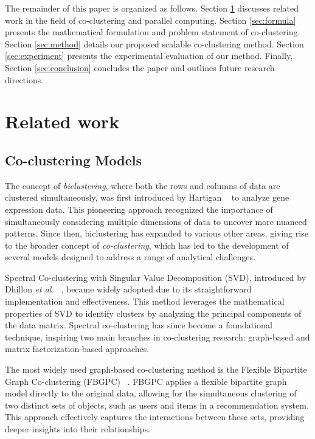 \documentclass[journal]{IEEEtran}
\renewcommand{\cite}[1]{~\autocite{#1}}
\begin{document}
The remainder of this paper is organized as follows. Section \ref{sec:related_work} discusses related work in the field of co-clustering and parallel computing. Section \ref{sec:formula} presents the mathematical formulation and problem statement of co-clustering. Section \ref{sec:method} details our proposed scalable co-clustering method. Section \ref{sec:experiment} presents the experimental evaluation of our method. Finally, Section \ref{sec:conclusion} concludes the paper and outlines future research directions.

\section{Related work}
\label{sec:related_work}

\subsection{Co-clustering Models}

The concept of \emph{biclustering}, where both the rows and columns of data are clustered simultaneously, was first introduced by Hartigan \cite{hartigan1972DirectClusteringData} to analyze gene expression data. This pioneering approach recognized the importance of simultaneously considering multiple dimensions of data to uncover more nuanced patterns. Since then, biclustering has expanded to various other areas, giving rise to the broader concept of \emph{co-clustering}, which has led to the development of several models designed to address a range of analytical challenges.

Spectral Co-clustering with Singular Value Decomposition (SVD), introduced by Dhillon \textit{et al.} \cite{dhillon2001CoclusteringDocumentsWords}, became widely adopted due to its straightforward implementation and effectiveness. This method leverages the mathematical properties of SVD to identify clusters by analyzing the principal components of the data matrix. Spectral co-clustering has since become a foundational technique, inspiring two main branches in co-clustering research: graph-based and matrix factorization-based approaches.

The most widely used graph-based co-clustering method is the Flexible Bipartite Graph Co-clustering (FBGPC) \cite{chen2023FastFlexibleBipartitea}. FBGPC applies a flexible bipartite graph model directly to the original data, allowing for the simultaneous clustering of two distinct sets of objects, such as users and items in a recommendation system. This approach effectively captures the interactions between these sets, providing deeper insights into their relationships.
\end{document}
